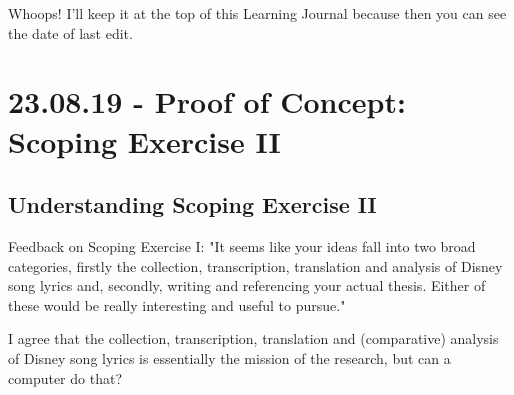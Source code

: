 \documentclass[12pt]{article}
\begin{document}
Whoops! I'll keep it at the top of this Learning Journal because then you can see the date of last edit.

\section{23.08.19 - Proof of Concept: Scoping Exercise II}
\subsection{Understanding Scoping Exercise II}
Feedback on Scoping Exercise I: "It seems like your ideas fall into two broad categories, firstly the collection, transcription, translation and analysis of Disney song lyrics and, secondly, writing and referencing your actual thesis. Either of these would be really interesting and useful to pursue."

I agree that the collection, transcription, translation and (comparative) analysis of Disney song lyrics is essentially the mission of the research, but can a computer do that?
 
\end{document}
